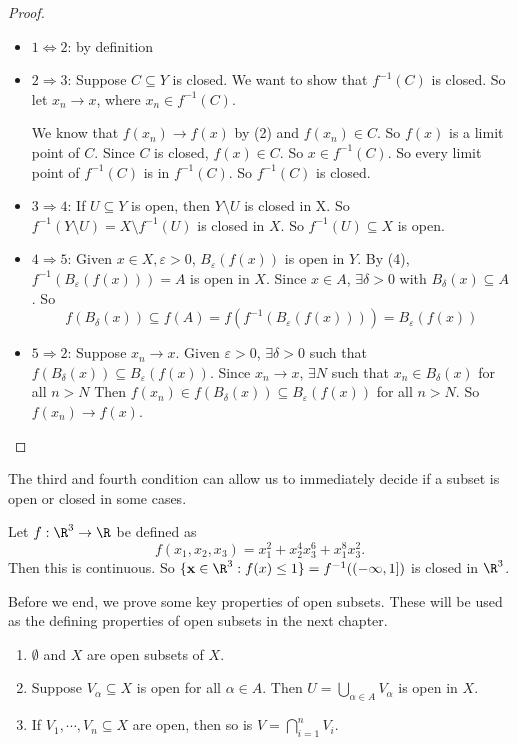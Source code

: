 \documentclass[a4paper]{article}
\begin{document}
\begin{proof}\leavevmode
  \begin{itemize}
    \item $1 \Leftrightarrow 2$: by definition
    \item $2 \Rightarrow 3$: Suppose $C\subseteq Y$ is closed. We want to show that $f^{-1}(C)$ is closed. So let $x_n \to x$, where $x_n \in f^{-1}(C)$.

      We know that $f(x_n) \to f(x)$ by (2) and $f(x_n) \in C$. So $f(x)$ is a limit point of $C$. Since $C$ is closed, $f(x) \in C$. So $x\in f^{-1}(C)$. So every limit point of $f^{-1}(C)$ is in $f^{-1}(C)$. So $f^{-1}(C)$ is closed.
    \item $3 \Rightarrow 4$: If $U\subseteq Y$ is open, then $Y\setminus U$ is closed in X. So $f^{-1}(Y\setminus U) = X\setminus f^{-1}(U)$ is closed in $X$. So $f^{-1}(U)\subseteq X$ is open.

    \item $4 \Rightarrow 5$: Given $x\in X, \varepsilon > 0$, $B_\varepsilon(f(x))$ is open in $Y$. By (4), $f^{-1}(B_\varepsilon(f(x))) = A$ is open in $X$. Since $x\in A$, $\exists \delta > 0$ with $B_\delta (x) \subseteq A$. So
      \[
        f(B_\delta(x)) \subseteq f(A) = f(f^{-1}(B_\varepsilon (f(x)))) = B_\varepsilon (f(x))
      \]
    \item $5 \Rightarrow 2$: Suppose $x_n \to x$. Given $\varepsilon > 0$, $\exists \delta > 0$ such that $f(B_\delta(x)) \subseteq B_\varepsilon(f(x))$. Since $x_n \to x$, $\exists N$ such that $x_n \in B_\delta (x)$ for all $n  > N$ Then $f(x_n) \in f(B_\delta(x))\subseteq B_\varepsilon(f(x))$ for all $n > N$. So $f(x_n) \to f(x)$.
  \end{itemize}
\end{proof}

The third and fourth condition can allow us to immediately decide if a subset is open or closed in some cases.

\begin{eg}
  Let $f: \R^3 \to \R$ be defined as
  \[
    f(x_1, x_2, x_3) = x_1^2 + x_2^4 x_3^6 + x_1^8 x_3^2.
  \]
  Then this is continuous. So $\{\mathbf{x}\in \R^3: f(x) \leq 1\} = f^{-1}((-\infty, 1])$ is closed in $\R^3$.
\end{eg}

Before we end, we prove some key properties of open subsets. These will be used as the defining properties of open subsets in the next chapter.
\begin{lemma}\leavevmode
  \begin{enumerate}
    \item $\emptyset$ and $X$ are open subsets of $X$.
    \item Suppose $V_\alpha \subseteq X$ is open for all $\alpha \in A$. Then $\displaystyle U = \bigcup_{\alpha \in A}V_\alpha$ is open in $X$.
    \item If $V_1, \cdots, V_n\subseteq X$ are open, then so is $\displaystyle V = \bigcap_{i = 1}^n V_i$.
  \end{enumerate}
\end{lemma}
\end{document}
